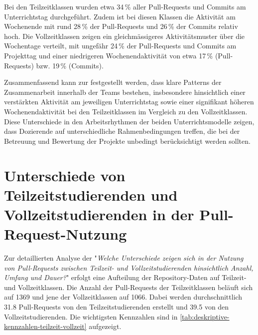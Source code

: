Bei den Teilzeitklassen wurden etwa 34\,\% aller Pull-Requests und Commits am Unterrichtstag durchgeführt. Zudem ist bei diesen Klassen die Aktivität am Wochenende mit rund 28\,\% der Pull-Requests und 26\,\% der Commits relativ hoch. Die Vollzeitklassen zeigen ein gleichmässigeres Aktivitätsmuster über die Wochentage verteilt, mit ungefähr 24\,\% der Pull-Requests und Commits am Projekttag und einer niedrigeren Wochenendaktivität von etwa 17\,\% (Pull-Requests) bzw. 19\,\% (Commits).

Zusammenfassend kann zur  festgestellt werden, dass klare Patterns der Zusammenarbeit innerhalb der Teams bestehen, insbesondere hinsichtlich einer verstärkten Aktivität am jeweiligen Unterrichtstag sowie einer signifikant höheren Wochenendaktivität bei den Teilzeitklassen im Vergleich zu den Vollzeitklassen.
Diese Unterschiede in den Arbeitsrhythmen der beiden Unterrichtsmodelle zeigen, dass Dozierende auf unterschiedliche Rahmenbedingungen treffen, die bei der Betreuung und Bewertung der Projekte unbedingt berücksichtigt werden sollten.
\section{Unterschiede von Teilzeitstudierenden und Vollzeitstudierenden in der Pull-Request-Nutzung}
Zur detaillierten Analyse der  "\textit{Welche Unterschiede zeigen sich in der Nutzung von Pull-Requests zwischen Teilzeit- und Vollzeitstudierenden hinsichtlich Anzahl, Umfang und Dauer?}" erfolgt eine Aufteilung der Repository-Daten auf Teilzeit- und Vollzeitklassen. Die Anzahl der Pull-Requests der Teilzeitklassen beläuft sich auf 1369 und jene der Vollzeitklassen auf 1066. Dabei werden durchschnittlich 31.8 Pull-Requests von den Teilzeitstudierenden erstellt und 39.5 von den Vollzeitstudierenden. Die wichtigsten Kennzahlen sind in \autoref{tab:deskriptive-kennzahlen-teilzeit-vollzeit} aufgezeigt.

